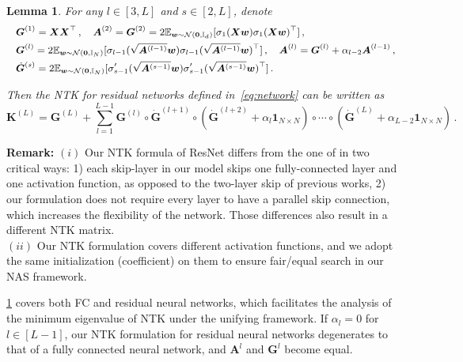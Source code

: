 \documentclass[nohyperref]{article}
\theoremstyle{plain}
\newtheorem{lemma}{Lemma}
\theoremstyle{definition}
\theoremstyle{remark}
\begin{document}
\begin{lemma}
\label{lemma:NTK_matrix_recursive_form}
For any $l \in [3, L]$ and $s \in [2, L]$, denote
\begin{equation*}
\small
    \begin{split}
        & \bm{G}^{(1)}=\bm{XX}^\top\,,\quad\bm{A}^{(2)} = \bm{G}^{(2)}=2\mathbb{E}_{\bm{w} \sim \mathcal N(\bm 0,\mathbb{I}_{d})}[\sigma_1(\bm{Xw})\sigma_1(\bm{Xw})^\top]\,,\\
        & \bm{G}^{(l)}=2\mathbb{E}_{\bm{w} \sim \mathcal N(\bm 0,\mathbb{I}_{N})}[\sigma_{l-1}(\sqrt{\bm{A}^{(l-1)}} \bm{w})\sigma_{l-1}(\sqrt{\bm{A}^{(l-1)}} \bm{w})^\top]\,,\quad\bm{A}^{(l)}=\bm{G}^{(l)}+\alpha_{l-2}\bm{A}^{(l-1)}\,,\\
        & \dot{\bm{G}}^{(s)} = 2\mathbb{E}_{\bm{w} \sim \mathcal N(\bm{0},\mathbb{I}_{N})}[{\sigma}'_{s-1}(\sqrt{\bm{A}^{(s-1)}} \bm{w}){\sigma}'_{s-1}(\sqrt{\bm{A}^{(s-1)}} \bm{w})^\top]\,.
    \end{split}
\end{equation*}



Then the NTK for residual networks defined in~\cref{eq:network} can be written as
\begin{equation*}
    \bm{K}^{(L)}=\bm{G}^{(L)} + \sum_{l=1}^{L-1}\bm{G}^{(l)}\circ \dot{\bm{G}}^{(l+1)} \circ (\dot{\bm{G}}^{(l+2)}+  \alpha_{l}\bm{1}_{N \times N})\circ \cdots \circ (\dot{\bm{G}}^{(L)}+ \alpha_{L-2}\bm{1}_{N \times N})\,.
\end{equation*}

\end{lemma}


{\bf Remark:}
$(i)$ Our NTK formula of ResNet differs from the one of \citet{tirer2021kernelbased, huang2020deep, belfer2021spectral} in two critical ways:
1) each skip-layer in our model skips one fully-connected layer and one activation function, as opposed to the two-layer skip of previous works, 2) our formulation does not require every layer to have a parallel skip connection, which increases the flexibility of the network. Those differences also result in a different NTK matrix.\\
$(ii)$ Our NTK formulation covers different activation functions, and we adopt the same initialization (coefficient) on them to ensure fair/equal search in our NAS framework.


\cref{lemma:NTK_matrix_recursive_form} covers both FC and residual neural networks, which facilitates the analysis of the minimum eigenvalue of NTK under the unifying framework. If $\alpha_{l} = 0$ for $l \in [L-1]$, our NTK formulation for residual neural networks degenerates to that of a fully connected neural network, and $\bm{A}^{l}$ and $\bm{G}^{l}$ become equal.
\end{document}
